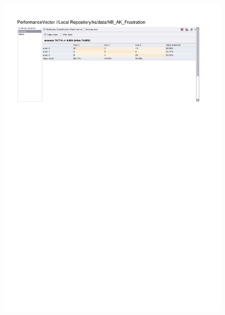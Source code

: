 \begin{figure}[htp]
  \centerline{\includegraphics[trim=0 680 0 60,clip,width=16.09cm]{results/NB_A_Frustration.pdf}} \caption{
} \label{NB_K_Frustration}
\end{figure}

